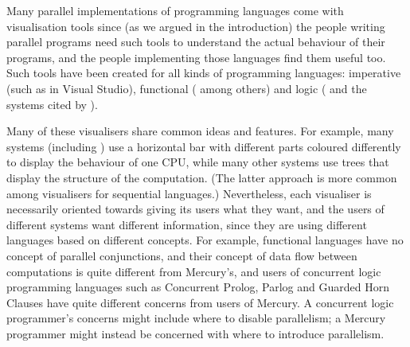 %
%
%
%


Many parallel implementations of programming languages
come with visualisation tools
since (as we argued in the introduction)
the people writing parallel programs
need such tools to understand the actual behaviour of their programs,
and the people implementing those languages find them useful too.
Such tools have been created for all kinds of programming languages:
imperative (such as in Visual Studio),
functional
(\citet{edentraceviewer,loidl98:gransim,runciman93:profilingparfp} among others)
and logic (\citet{Foster96,vace}
and the systems cited by \citet{Gupta95parallelexecution}).

Many of these visualisers share common ideas and features.
For example, many systems (including \tscope)
use a horizontal bar with different parts coloured differently
to display the behaviour of one CPU,
while many other systems use trees
that display the structure of the computation.
(The latter approach is more common
among visualisers for sequential languages.)
Nevertheless, each visualiser is necessarily oriented
towards giving its users what they want,
and the users of different systems want different information,
since they are using different languages based on different concepts.
For example, functional languages have no concept of parallel conjunctions,
and their concept of data flow between computations
is quite different from Mercury's,
and users of concurrent logic programming languages
such as Concurrent Prolog, Parlog and Guarded Horn Clauses
have quite different concerns from users of Mercury.
A concurrent logic programmer's concerns might include
where to disable parallelism;
a Mercury programmer might instead be concerned with
where to introduce parallelism.

